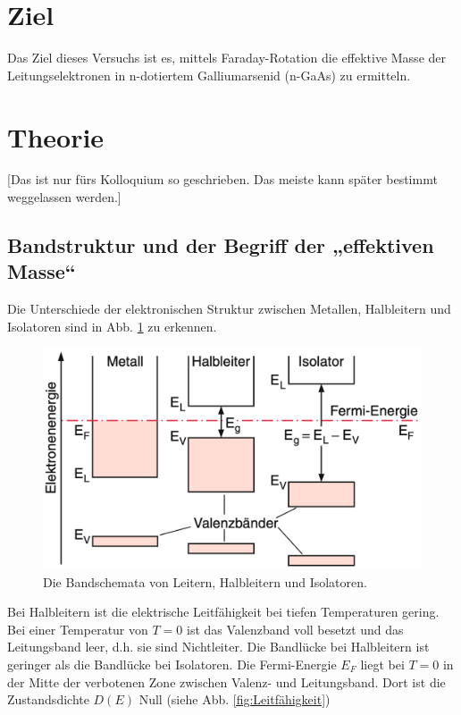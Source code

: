 \section{Ziel}
Das Ziel dieses Versuchs ist es, mittels Faraday-Rotation die effektive Masse der Leitungselektronen in n-dotiertem Galliumarsenid (n-GaAs) zu ermitteln.

\section{Theorie}
\label{sec:Theorie}

[Das ist nur fürs Kolloquium so geschrieben. Das meiste kann später bestimmt weggelassen werden.]

\subsection{Bandstruktur und der Begriff der „effektiven Masse“}
Die Unterschiede der elektronischen Struktur zwischen Metallen, Halbleitern und Isolatoren sind in Abb. \ref{fig:Bandschemata} zu erkennen.
\begin{figure}
    \centering
    \includegraphics[width=12cm]{fotos/Bandschemata.png}
    \caption{Die Bandschemata von Leitern, Halbleitern und Isolatoren. \cite{demtroeder}}
    \label{fig:Bandschemata}
\end{figure}
Bei Halbleitern ist die elektrische Leitfähigkeit bei tiefen Temperaturen gering. Bei einer Temperatur von $T = \num{0}$ ist das Valenzband voll besetzt und das Leitungsband leer, d.h. sie sind Nichtleiter. Die Bandlücke bei Halbleitern ist geringer als die Bandlücke bei Isolatoren. \cite{demtroeder}
Die Fermi-Energie $E_F$ liegt bei $T = \num{0}$ in der Mitte der verbotenen Zone zwischen Valenz- und Leitungsband. Dort ist die Zustandsdichte $D(E)$ Null (siehe Abb. \ref{fig:Leitfähigkeit})


